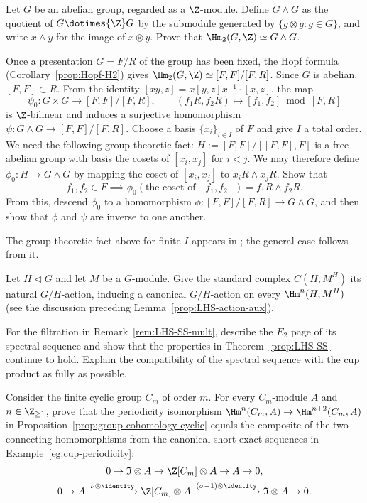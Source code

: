 \begin{Exercises}
	\item Let $G$ be an abelian group, regarded as a $\Z$-module. Define
	$G\wedge G$ as the quotient of $G\dotimes{\Z}G$ by the submodule
	generated by $\{g\otimes g:g\in G\}$, and write $x\wedge y$ for the
	image of $x\otimes y$. Prove that $\Hm_2(G,\Z)\simeq G\wedge G$.

	\begin{hint}
		\index[sym1]{[,]}
		Once a presentation $G=F/R$ of the group has been fixed, the Hopf
		formula (Corollary~\ref{prop:Hopf-H2}) gives
		$\Hm_2(G,\Z)\simeq[F,F]/[F,R]$. Since $G$ is abelian,
		$[F,F]\subset R$. From the identity
		$[xy,z]=x[y,z]x^{-1}\cdot[x,z]$, the map
		\[ \psi_0:G\times G\to[F,F]/[F,R],\qquad
		(f_1R,f_2R)\mapsto[f_1,f_2]\bmod[F,R] \]
		is $\Z$-bilinear and induces a surjective homomorphism
		$\psi:G\wedge G\to[F,F]/[F,R]$. Choose a basis
		$\{x_i\}_{i\in I}$ of $F$ and give $I$ a total order. We need the
		following group-theoretic fact:
		$H:=[F,F]/[[F,F],F]$ is a free abelian group with basis the cosets of
		$[x_i,x_j]$ for $i<j$. We may therefore define
		$\phi_0:H\to G\wedge G$ by mapping the coset of $[x_i,x_j]$ to
		$x_iR\wedge x_jR$. Show that
		\[ f_1,f_2\in F\implies
		\phi_0(\text{the coset of }[f_1,f_2])=f_1R\wedge f_2R. \]
		From this, descend $\phi_0$ to a homomorphism
		$\phi:[F,F]/[F,R]\to G\wedge G$, and then show that $\phi$ and
		$\psi$ are inverse to one another.

		The group-theoretic fact above for finite $I$ appears in
		\cite[Theorem 11.2.4]{Ha76}; the general case follows from it.
	\end{hint}

	\item Let $H\lhd G$ and let $M$ be a $G$-module. Give the standard
	complex $C(H,M^H)$ its natural $G/H$-action, inducing a canonical
	$G/H$-action on every $\Hm^n(H,M^H)$ (see the discussion preceding
	Lemma~\ref{prop:LHS-action-aux}).

	\item For the filtration in Remark~\ref{rem:LHS-SS-mult}, describe the
	$E_2$ page of its spectral sequence and show that the properties in
	Theorem~\ref{prop:LHS-SS} continue to hold. Explain the compatibility of
	the spectral sequence with the cup product as fully as possible.

	\item Consider the finite cyclic group $C_m$ of order $m$. For every
	$C_m$-module $A$ and $n\in\Z_{\geq1}$, prove that the periodicity
	isomorphism $\Hm^n(C_m,A)\to\Hm^{n+2}(C_m,A)$ in
	Proposition~\ref{prop:group-cohomology-cyclic} equals the composite of
	the two connecting homomorphisms from the canonical short exact sequences
	in Example~\ref{eg:cup-periodicity}:
	\begin{gather*}
		0\to\mathfrak{I}\otimes A\to\Z[C_m]\otimes A\to A\to0,\\
		0\to A\xrightarrow{\nu\otimes\identity}\Z[C_m]\otimes A
		\xrightarrow{(\sigma-1)\otimes\identity}\mathfrak{I}\otimes A\to0.
	\end{gather*}


\end{Exercises}

